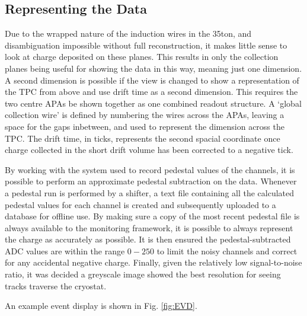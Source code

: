 \subsection{Representing the Data}\label{RepresentingEVDData}

Due to the wrapped nature of the induction wires in the 35ton, and disambiguation impossible without full reconstruction, it makes little sense to look at charge deposited on these planes.  This results in only the collection planes being useful for showing the data in this way, meaning just one dimension.  A second dimension is possible if the view is changed to show a representation of the TPC from above and use drift time as a second dimension.  This requires the two centre APAs be shown together as one combined readout structure.  A `global collection wire' is defined by numbering the wires across the APAs, leaving a space for the gaps inbetween, and used to represent the dimension across the TPC.  The drift time, in ticks, represents the second spacial coordinate once charge collected in the short drift volume has been corrected to a negative tick.

By working with the system used to record pedestal values of the channels, it is possible to perform an approximate pedestal subtraction on the data.  Whenever a pedestal run is performed by a shifter, a text file containing all the calculated pedestal values for each channel is created and subsequently uploaded to a database for offline use.  By making sure a copy of the most recent pedestal file is always available to the monitoring framework, it is possible to always represent the charge as accurately as possible.  It is then ensured the pedestal-subtracted ADC values are within the range $0-250$ to limit the noisy channels and correct for any accidental negative charge.  Finally, given the relatively low signal-to-noise ratio, it was decided a greyscale image showed the best resolution for seeing tracks traverse the cryostat.

An example event display is shown in Fig. \ref{fig:EVD}.

